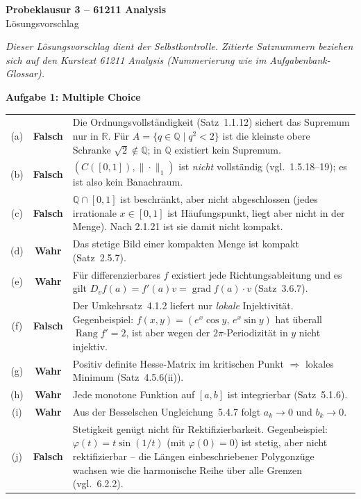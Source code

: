 \documentclass[a4paper,12pt]{article}
\newcommand{\aufgabe}[2]{%
  \bigskip\par\noindent\textbf{Aufgabe #1: #2}\par\nobreak\medskip}
\begin{document}
\begin{center}
  {\LARGE\bfseries Probeklausur 3 -- 61211 Analysis}\\[0.4em]
  {\large Lösungsvorschlag}
\end{center}

\medskip
\noindent\textit{Dieser Lösungsvorschlag dient der Selbstkontrolle. Zitierte Satznummern
beziehen sich auf den Kurstext 61211 Analysis (Nummerierung wie im Aufgabenbank-Glossar).}

\aufgabe{1}{Multiple Choice}

\renewcommand{\arraystretch}{1.4}
\noindent\begin{tabular}{@{}c@{\hspace{0.8em}}c@{\hspace{0.8em}}p{12.5cm}@{}}
  (a) & \textbf{Falsch} & Die Ordnungsvollständigkeit (Satz~1.1.12) sichert das Supremum nur in $\mathbb{R}$. Für $A=\{q\in\mathbb{Q}\mid q^2<2\}$ ist die kleinste obere Schranke $\sqrt2\notin\mathbb{Q}$; in $\mathbb{Q}$ existiert kein Supremum.\\
  (b) & \textbf{Falsch} & $(C([0,1]),\|\cdot\|_1)$ ist \emph{nicht} vollständig (vgl.\ 1.5.18--19); es ist also kein Banachraum.\\
  (c) & \textbf{Falsch} & $\mathbb{Q}\cap[0,1]$ ist beschränkt, aber nicht abgeschlossen (jedes irrationale $x\in[0,1]$ ist Häufungspunkt, liegt aber nicht in der Menge). Nach 2.1.21 ist sie damit nicht kompakt.\\
  (d) & \textbf{Wahr} & Das stetige Bild einer kompakten Menge ist kompakt (Satz~2.5.7).\\
  (e) & \textbf{Wahr} & Für differenzierbares $f$ existiert jede Richtungsableitung und es gilt $D_v f(a)=f'(a)v=\operatorname{grad} f(a)\cdot v$ (Satz~3.6.7).\\
  (f) & \textbf{Falsch} & Der Umkehrsatz~4.1.2 liefert nur \emph{lokale} Injektivität. Gegenbeispiel: $f(x,y)=(e^{x}\cos y,\,e^{x}\sin y)$ hat überall $\operatorname{Rang} f'=2$, ist aber wegen der $2\pi$-Periodizität in $y$ nicht injektiv.\\
  (g) & \textbf{Wahr} & Positiv definite Hesse-Matrix im kritischen Punkt $\Rightarrow$ lokales Minimum (Satz~4.5.6(ii)).\\
  (h) & \textbf{Wahr} & Jede monotone Funktion auf $[a,b]$ ist integrierbar (Satz~5.1.6).\\
  (i) & \textbf{Wahr} & Aus der Besselschen Ungleichung~5.4.7 folgt $a_k\to 0$ und $b_k\to 0$.\\
  (j) & \textbf{Falsch} & Stetigkeit genügt nicht für Rektifizierbarkeit. Gegenbeispiel: $\varphi(t)=t\sin(1/t)$ (mit $\varphi(0)=0$) ist stetig, aber nicht rektifizierbar -- die Längen einbeschriebener Polygonzüge wachsen wie die harmonische Reihe über alle Grenzen (vgl.\ 6.2.2).\\
\end{tabular}
\end{document}
